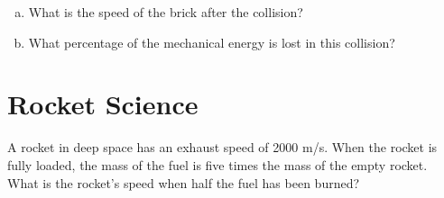 \documentclass[12pt]{article}
\begin{document}
\begin{enumerate}[(a)]
	\item What is the speed of the brick after the collision?
	\item What percentage of the mechanical energy is lost in this collision?
\end{enumerate}


\section{Rocket Science}
A rocket in deep space has an exhaust speed of 2000 m/s. When the rocket is fully loaded, the mass of the fuel is five times the mass of the empty rocket. What is the rocket's speed when half the fuel has been burned? 
\end{document}
